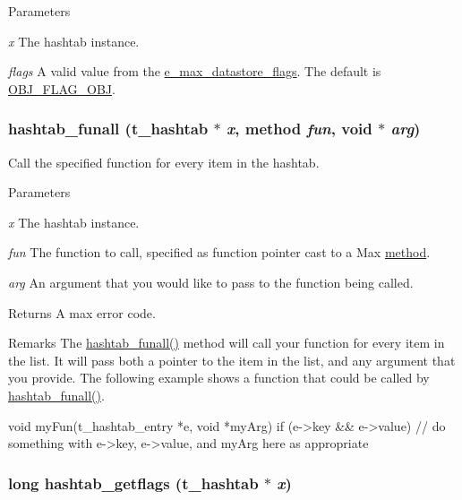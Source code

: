 \begin{DoxyParams}{Parameters}
\item[{\em x}]The hashtab instance. \item[{\em flags}]A valid value from the \hyperlink{group__datastore_gaa858d4b3815076d79624c39d9ca59348}{e\_\-max\_\-datastore\_\-flags}. The default is \hyperlink{group__datastore_ggaa858d4b3815076d79624c39d9ca59348adc630c58c8e958a404553a08db6fd180}{OBJ\_\-FLAG\_\-OBJ}. \end{DoxyParams}
\hypertarget{group__hashtab_ga37e7b5c20c9fc69e9435f788f35335dc}{
\subsubsection[{hashtab\_\-funall}]{ hashtab\_\-funall ({\bf t\_\-hashtab} $\ast$ {\em x}, \/  {\bf method} {\em fun}, \/  void $\ast$ {\em arg})}}
\label{group__hashtab_ga37e7b5c20c9fc69e9435f788f35335dc}


Call the specified function for every item in the hashtab. 
\begin{DoxyParams}{Parameters}
\item[{\em x}]The hashtab instance. \item[{\em fun}]The function to call, specified as function pointer cast to a Max \hyperlink{group__datatypes_gac26ba0a173b50597f5738132e059b42d}{method}. \item[{\em arg}]An argument that you would like to pass to the function being called. \end{DoxyParams}
\begin{DoxyReturn}{Returns}
A max error code.
\end{DoxyReturn}
\begin{DoxyRemark}{Remarks}
The \hyperlink{group__hashtab_ga37e7b5c20c9fc69e9435f788f35335dc}{hashtab\_\-funall()} method will call your function for every item in the list. It will pass both a pointer to the item in the list, and any argument that you provide. The following example shows a function that could be called by \hyperlink{group__hashtab_ga37e7b5c20c9fc69e9435f788f35335dc}{hashtab\_\-funall()}. 
\begin{DoxyCode}
    void myFun(t_hashtab_entry *e, void *myArg)
    {
        if (e->key && e->value) {
            // do something with e->key, e->value, and myArg here as appropriate
        }
    }
\end{DoxyCode}
 
\end{DoxyRemark}
\hypertarget{group__hashtab_gacb0dd87fc4594d35d53998e7fde2c2b8}{
\subsubsection[{hashtab\_\-getflags}]{\setlength{\rightskip}{0pt plus 5cm}long hashtab\_\-getflags ({\bf t\_\-hashtab} $\ast$ {\em x})}}
\label{group__hashtab_gacb0dd87fc4594d35d53998e7fde2c2b8}


